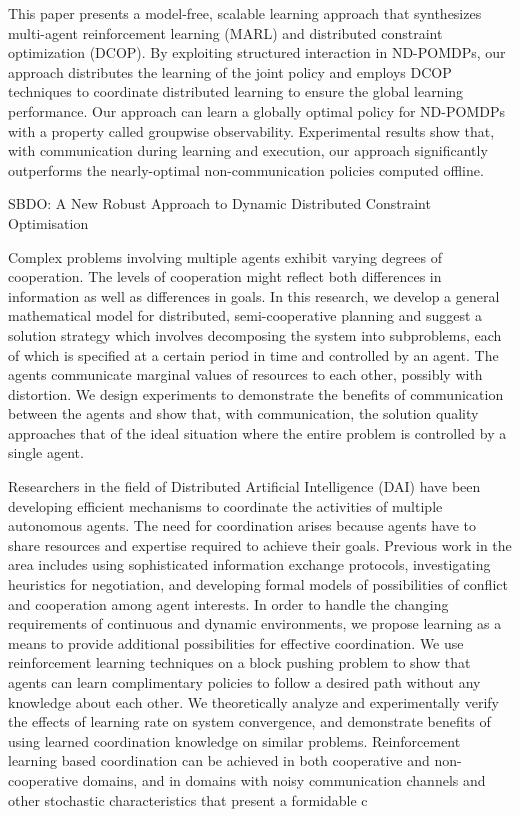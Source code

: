 \documentclass[conference]{IEEEtran}
\begin{document}
\cite{zhang2011coordinated} This paper presents a
model-free, scalable learning approach that synthesizes
multi-agent reinforcement learning (MARL) and distributed
constraint optimization (DCOP). By exploiting
structured interaction in ND-POMDPs, our approach
distributes the learning of the joint policy and employs
DCOP techniques to coordinate distributed learning to
ensure the global learning performance. Our approach
can learn a globally optimal policy for ND-POMDPs
with a property called groupwise observability. Experimental
results show that, with communication during
learning and execution, our approach significantly outperforms
the nearly-optimal non-communication policies
computed offline.

SBDO: A New Robust Approach to Dynamic Distributed Constraint Optimisation

\cite{zhang2013coordinating}

\cite{banerjee2012sample}

\cite{kraemer2012informed}

\cite{boukhtouta2011adaptive}
Complex problems involving multiple agents exhibit varying degrees of
cooperation. The levels of cooperation might reflect both differences in
information as well as differences in goals. In this research, we develop a
general mathematical model for distributed, semi-cooperative planning and
suggest a solution strategy which involves decomposing the system into
subproblems, each of which is specified at a certain period in time and
controlled by an agent. The agents communicate marginal values of resources to
each other, possibly with distortion. We design experiments to demonstrate the
benefits of communication between the agents and show that, with
communication, the solution quality approaches that of the ideal situation
where the entire problem is controlled by a single agent.

\cite{sen1994learning}
Researchers in the field of Distributed Artificial
Intelligence (DAI) have been developing efficient
mechanisms to coordinate the activities of multiple
autonomous agents. The need for coordination
arises because agents have to share resources
and expertise required to achieve their goals.
Previous work in the area includes using sophisticated
information exchange protocols, investigating
heuristics for negotiation, and developing
formal models of possibilities of conflict and cooperation
among agent interests. In order to handle
the changing requirements of continuous and
dynamic environments, we propose learning as a
means to provide additional possibilities for effective
coordination. We use reinforcement learning
techniques on a block pushing problem to show
that agents can learn complimentary policies to
follow a desired path without any knowledge
about each other. We theoretically analyze and
experimentally verify the effects of learning rate
on system convergence, and demonstrate benefits
of using learned coordination knowledge on similar
problems. Reinforcement learning based coordination
can be achieved in both cooperative and
non-cooperative domains, and in domains with
noisy communication channels and other stochastic
characteristics that present a formidable c
\end{document}
